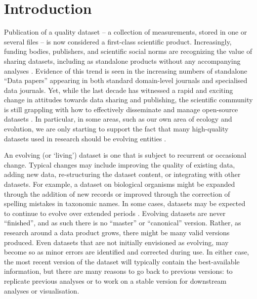 \documentclass[a4paper,num-refs]{assets/oup-contemporary}
\begin{document}
\section{Introduction}

Publication of a quality dataset -- a collection of measurements, stored in one or several files -- is now considered a first-class scientific product. Increasingly, funding bodies, publishers, and scientific social norms are recognizing the value of sharing datasets, including as standalone products without any accompanying analyses \cite{Whitlock-2011,Fairbairn-2011,Piwowar-2011,VanNoorden-2013,Gibney-2013}. Evidence of this trend is seen in the increasing numbers of standalone ``Data papers'' appearing in both standard domain-level journals and specialised data journals. Yet, while the last decade has witnessed a rapid and exciting change in attitudes towards data sharing and publishing, the scientific community is still grappling with how to effectively disseminate and manage open-source datasets \cite{Whitlock-2011, Goodman-2014, Force11-2014, Lowndes-2017, Perkel-2016, VanNoorden-2013, Kratz-2015,Wilkinson-2016, Yenni-2018}. In particular, in some areas, such as our own area of ecology and evolution, we are only starting to support the fact that many high-quality datasets used in research should be evolving entities \cite{Yenni-2018}.

An evolving (or `living') dataset is one that is subject to recurrent or occasional change.  Typical changes may include improving the quality of existing data, adding new data, re-structuring the dataset content, or integrating with other datasets. For example, a dataset on biological organisms might be expanded through the addition of new records or improved through the correction of spelling mistakes in taxonomic names. In some cases, datasets may be expected to continue to evolve over extended periods \cite[e.g.][]{Ernest-2018}. Evolving datasets are never ``finished'', and as such there is no ``master'' or ``canonical'' version. Rather, as research around a data product grows, there might be many valid versions produced. Even datasets that are not initially envisioned as evolving, may become so as minor errors are identified and corrected during use. In either case, the most recent version of the dataset will typically contain the best-available information, but there are many reasons to go back to previous versions: to replicate previous analyses or to work on a stable version for downstream analyses or visualisation.  
\end{document}
